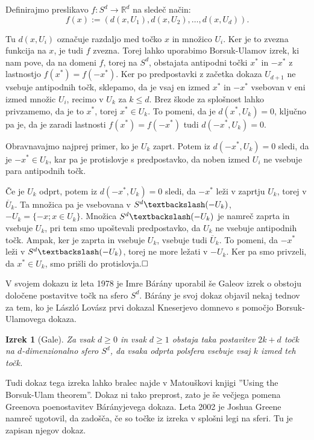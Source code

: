 \documentclass[a4paper,12pt]{article}
\def\qed{$\hfill\Box$}   %
\newtheorem{izrek}{Izrek}
\begin{document}
Definirajmo preslikavo $f:S^d \rightarrow \mathbb{R}^d$ na sledeč način:
$$f(x) := (d(x,U_1), d(x,U_2), \ldots, d(x,U_d)).$$

Tu $d(x,U_i)$ označuje razdaljo med točko $x$ in množico $U_i$. Ker je to zvezna funkcija na $x$, je tudi $f$ zvezna. Torej lahko uporabimo Borsuk-Ulamov izrek, ki nam pove, da na domeni $f$, torej na $S^d$, obstajata antipodni točki $x^*$ in $-x^*$ z lastnostjo $f(x^*)=f(-x^*)$. Ker po predpostavki z začetka dokaza $U_{d+1}$ ne vsebuje antipodnih točk, sklepamo, da je vsaj en izmed $x^*$ in $-x^*$ vsebovan v eni izmed množic $U_i$, recimo v $U_k$ za $k\leq d$. Brez škode za splošnost lahko privzamemo, da je to $x^*$, torej $x^* \in U_k$. To pomeni, da je $d(x^*, U_k) = 0$, ključno pa je, da je zaradi lastnosti $f(x^*)=f(-x^*)$ tudi $d(-x^*, U_k) = 0$.

Obravnavajmo najprej primer, ko je $U_k$ zaprt. Potem iz $d(-x^*, U_k) = 0$ sledi, da je $-x^* \in U_k$, kar pa je protislovje s predpostavko, da noben izmed $U_i$ ne vsebuje para antipodnih točk.

Če je $U_k$ odprt, potem iz $d(-x^*, U_k) = 0$ sledi, da $-x^*$ leži v zaprtju $U_k$, torej v $\overline U_k$. Ta množica pa je vsebovana v $S^d\textbackslash(-U_k)$, \mbox{$-U_k = \{-x;x \in U_k\}$}. Množica $S^d\textbackslash(-U_k)$ je namreč zaprta in vsebuje $U_k$, pri tem smo upoštevali predpostavko, da $U_k$ ne vsebuje antipodnih točk. Ampak, ker je zaprta in vsebuje $U_k$, vsebuje tudi $\overline U_k$. To pomeni, da $-x^*$ leži v  $S^d\textbackslash(-U_k)$, torej ne more ležati v $-U_k$. Ker pa smo privzeli, da $x^* \in U_k$, smo prišli do protislovja.\qed 
\newpage

V svojem dokazu iz leta 1978 je Imre Bárány uporabil še Galeov izrek o obstoju določene postavitve točk na sfero $S^d$. Bárány je svoj dokaz objavil nekaj tednov za tem, ko je László Lovász prvi dokazal Kneserjevo domnevo s pomočjo Borsuk-Ulamovega dokaza.

\begin{izrek}[Gale]
Za vsak $d \geq 0$ in vsak $d \geq 1$ obstaja taka postavitev $2k+d$ točk na $d$-dimenzionalno sfero $S^d$, da vsaka odprta polsfera vsebuje vsaj $k$ izmed teh točk.
\end{izrek}

Tudi dokaz tega izreka lahko bralec najde v Matouškovi knjigi ''Using the Borsuk-Ulam theorem''. Dokaz ni tako preprost, zato je še večjega pomena Greenova poenostavitev Bárányjevega dokaza. Leta 2002 je Joshua Greene namreč ugotovil, da zadošča, če so točke iz izreka v splošni legi na sferi. Tu je zapisan njegov dokaz.
\end{document}
